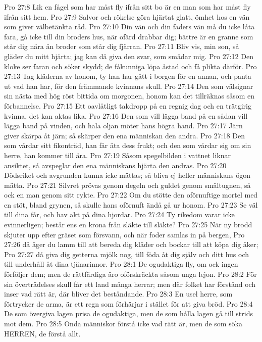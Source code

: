 Pro 27:8  Lik en fågel som har måst fly ifrån sitt bo är en man som har måst fly ifrån sitt hem.
Pro 27:9  Salvor och rökelse göra hjärtat glatt, ömhet hos en vän som giver välbetänkta råd.
Pro 27:10  Din vän och din faders vän må du icke låta fara, gå icke till din broders hus, när ofärd drabbar dig; bättre är en granne som står dig nära än broder som står dig fjärran.
Pro 27:11  Bliv vis, min son, så gläder du mitt hjärta; jag kan då giva den svar, som smädar mig.
Pro 27:12  Den kloke ser faran och söker skydd; de fåkunniga löpa åstad och få plikta därför.
Pro 27:13  Tag kläderna av honom, ty han har gått i borgen för en annan, och panta ut vad han har, för den främmande kvinnans skull.
Pro 27:14  Den som välsignar sin nästa med hög röst bittida om morgonen, honom kan det tillräknas såsom en förbannelse.
Pro 27:15  Ett oavlåtligt takdropp på en regnig dag och en trätgirig kvinna, det kan aktas lika.
Pro 27:16  Den som vill lägga band på en sådan vill lägga band på vinden, och hala oljan möter hans högra hand.
Pro 27:17  Järn giver skärpa åt järn; så skärper den ena människan den andra.
Pro 27:18  Den som vårdar sitt fikonträd, han får äta dess frukt; och den som vårdar sig om sin herre, han kommer till ära.
Pro 27:19  Såsom spegelbilden i vattnet liknar ansiktet, så avspeglar den ena människans hjärta den andras.
Pro 27:20  Dödsriket och avgrunden kunna icke mättas; så bliva ej heller människans ögon mätta.
Pro 27:21  Silvret prövas genom degeln och guldet genom smältugnen, så ock en man genom sitt rykte.
Pro 27:22  Om du stötte den oförnuftige mortel med en stöt, bland grynen, så skulle hans oförnuft ändå gå ur honom.
Pro 27:23  Se väl till dina får, och hav akt på dina hjordar.
Pro 27:24  Ty rikedom varar icke evinnerligen; består ens en krona från släkte till släkte?
Pro 27:25  När ny brodd skjuter upp efter gräset som försvann, och när foder samlas in på bergen,
Pro 27:26  då äger du lamm till att bereda dig kläder och bockar till att köpa dig åker;
Pro 27:27  då giva dig getterna mjölk nog, till föda åt dig själv och ditt hus och till underhåll åt dina tjänarinnor.
Pro 28:1  De ogudaktiga fly, om ock ingen förföljer dem; men de rättfärdiga äro oförskräckta såsom unga lejon.
Pro 28:2  För sin överträdelses skull får ett land många herrar; men där folket har förstånd och inser vad rätt är, där bliver det beståndande.
Pro 28:3  En usel herre, som förtrycker de arma, är ett regn som förhärjar i stället för att giva bröd.
Pro 28:4  De som övergiva lagen prisa de ogudaktiga, men de som hålla lagen gå till strids mot dem.
Pro 28:5  Onda människor förstå icke vad rätt är, men de som söka HERREN, de förstå allt.
